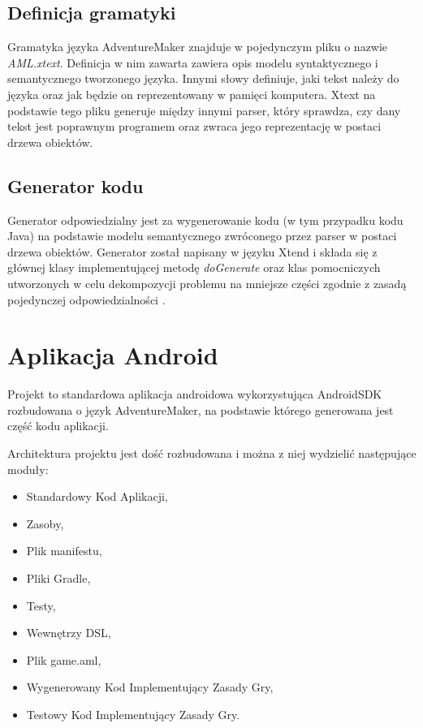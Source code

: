 \documentclass[openright]{xmgr}
\begin{document}
\subsection{Definicja gramatyki} 

Gramatyka języka AdventureMaker znajduje w pojedynczym pliku o nazwie \textit{AML.xtext}. Definicja w nim zawarta zawiera opis modelu syntaktycznego i semantycznego tworzonego języka. Innymi słowy definiuje, jaki tekst należy do języka oraz jak będzie on reprezentowany w pamięci komputera. Xtext na podstawie tego pliku generuje między innymi parser, który sprawdza, czy dany tekst jest poprawnym programem oraz zwraca jego reprezentację w postaci drzewa obiektów.

\subsection{Generator kodu}
Generator odpowiedzialny jest za wygenerowanie kodu (w tym przypadku kodu Java) na podstawie modelu semantycznego zwróconego przez parser w postaci drzewa obiektów. Generator został napisany w języku Xtend i składa się z głównej klasy implementującej metodę \textit{doGenerate} oraz klas pomocniczych utworzonych w celu dekompozycji problemu na mniejsze części zgodnie z zasadą pojedynczej odpowiedzialności \cite{CleanCode:2005}.

\section{Aplikacja Android}
Projekt to standardowa aplikacja androidowa wykorzystująca AndroidSDK rozbudowana o język AdventureMaker, na podstawie którego generowana jest część kodu aplikacji.

Architektura projektu jest dość rozbudowana i można z niej wydzielić następujące moduły:

\begin{itemize}
	\item Standardowy Kod Aplikacji,
	\item Zasoby,
	\item Plik manifestu,
	\item Pliki Gradle,
	\item Testy,
	\item Wewnętrzy DSL,
	\item Plik game.aml,
	\item Wygenerowany Kod Implementujący Zasady Gry,
	\item Testowy Kod Implementujący Zasady Gry.
\end{itemize}
\end{document}

